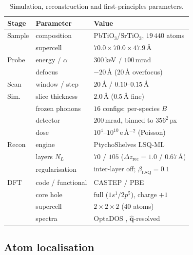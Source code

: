 \documentclass[aps,prb,twocolumn,superscriptaddress,floatfix,nofootinbib]{revtex4-2}
\begin{document}
\begin{table}[t]
  \centering \small
  \begin{tabular}{@{}lll@{}}
    \toprule
    Stage & Parameter & Value \\
    \midrule
    Sample & composition & PbTiO$_3$/SrTiO$_3$, $19\,440$ atoms \\
           & supercell & $70.0\times70.0\times47.9$\,\AA \\
    \addlinespace
    Probe  & energy / $\alpha$ & $300$\,keV / $100$\,mrad \\
           & defocus & $-20$\,\AA{} ($20$\,\AA{} overfocus) \\
    \addlinespace
    Scan   & window / step & $20$\,\AA{} / $0.10$--$0.15$\,\AA \\
    \addlinespace
    Sim.   & slice thickness & $2.0$\,\AA{} ($0.5$\,\AA{} fine) \\
           & frozen phonons & $16$ configs; per-species $B$ \\
           & detector & $200$\,mrad, binned to $356^2$\,px \\
           & dose & $10^{4}$--$10^{10}$\,e\,\AA$^{-2}$ (Poisson) \\
    \addlinespace
    Recon  & engine & PtychoShelves LSQ-ML \\
           & layers $N_L$ & $70$ / $105$ ($\Delta z_{\mathrm{rec}}=1.0$ / $0.67$\,\AA) \\
           & regularisation & inter-layer off; $\beta_{\mathrm{LSQ}}=0.1$ \\
    \addlinespace
    DFT    & code / functional & CASTEP \citep{Clark2005} / PBE \\
           & core hole & full ($1s^1$/$2p^5$), charge $+1$ \\
           & supercell & $2\times2\times2$ (40 atoms) \\
           & spectra & OptaDOS \citep{Morris2014}, $\hat{\mathbf{q}}$-resolved \\
    \bottomrule
  \end{tabular}
  \caption{Simulation, reconstruction and first-principles parameters.}
  \label{tab:params}
\end{table}

\subsection{Atom localisation}
\label{sec:atomfind}
\end{document}
